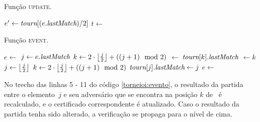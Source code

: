 \begin{algorithm}
    \caption{Função \textsc{update}.} \label{torneioi:update}
\begin{algorithmic}[1]
            \State $e'\leftarrow \textit{tourn}[(e.\textit{lastMatch})/2]$
            \State $t \leftarrow $ 
            \State {}
        \EndIf
    \EndFunction
\end{algorithmic}
\end{algorithm}
\begin{algorithm}
    \caption{Função \textsc{event}.} \label{torneioi:evento}
\begin{algorithmic}[1]
        \State $e \leftarrow  $ 
            \State $j \leftarrow e.\textit{lastMatch}$
            \State $k \leftarrow 2\cdot \left\lfloor \frac{j}{2} \right\rfloor
            + ((j + 1)\mod2)$ 
                \State {}
                $\leftarrow~$\torneio[$j$]
                \State $\textit{tourn}[k].\textit{lastMatch}$ $\leftarrow k$
                \State {}
                \State $j \leftarrow \left\lfloor \frac{j}{2} \right\rfloor$
                \State $k \leftarrow 2\cdot \left\lfloor \frac{j}{2} \right\rfloor
                + ((j + 1)\mod2)$ 
            \EndWhile
            \State $\textit{tourn}[j].\textit{lastMatch} \leftarrow j$
            \State {}
            \State $e \leftarrow  $ 
        \EndWhile
    \EndFunction
\end{algorithmic}
\end{algorithm}

No trecho das linhas 5 - 11 do código \ref{torneioi:evento},
o resultado da partida entre o elemento~$j$ e seu adversário
que se encontra na posição $k$ de \torneio~é recalculado, e o
certificado correspondente é atualizado. Caso o resultado da
partida tenha sido alterado, a verificação se propaga para o
nível de cima.

